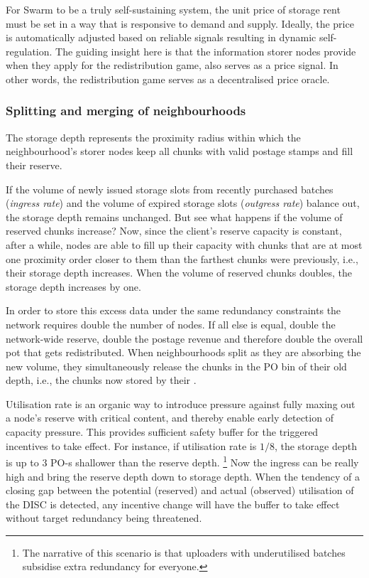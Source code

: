 For Swarm to be a truly self-sustaining system, the unit price of storage rent must be set in a way that is responsive to demand and supply. Ideally, the price is automatically adjusted based on reliable signals resulting in dynamic self-regulation. The guiding insight here is that the information storer nodes provide when  they apply for the redistribution game, also serves as a price signal. In other words, the redistribution game serves as a decentralised price oracle.



\subsubsection{Splitting and merging of neighbourhoods}

The storage depth represents the proximity radius within which the neighbourhood's storer nodes keep all chunks with valid postage stamps and fill their reserve. 


If the volume of newly issued storage slots from recently purchased batches (\emph{ingress rate}\/) and the volume of expired storage slots (\emph{outgress rate}\/) balance out, the storage depth remains unchanged.
But see what happens if the volume of  reserved chunks increase?
Now, since the client's reserve capacity is constant, after a while, nodes are able to fill up their capacity with chunks that are at most one proximity order closer to them than the farthest chunks were previously, i.e.,  their storage depth increases.
When the volume of reserved chunks doubles,  the storage depth increases by one.  

In order to store this excess data under the same redundancy constraints the network requires double the number of nodes. If all else is equal, double the network-wide reserve, double the postage revenue and therefore double the overall pot that gets redistributed. When neighbourhoods split as they are absorbing the new volume, they simultaneously release the chunks in the PO bin of their old depth, i.e., the chunks now stored by their . 

Utilisation rate is an organic way to  introduce pressure against fully maxing out a node's reserve with critical content, and thereby enable early detection of capacity pressure. This provides  sufficient safety buffer for the triggered incentives to take effect. For instance,  if utilisation rate is $1/8$, the storage depth is up to 3 PO-s shallower than the reserve depth.%
%
\footnote{The narrative of this scenario is that uploaders with underutilised batches subsidise extra redundancy for everyone.}
%
Now the ingress can be really high and bring the reserve depth down to storage depth. When the tendency of a closing gap between the potential (reserved) and actual (observed) utilisation of the DISC is detected, any incentive change will have the buffer to take effect without target redundancy being threatened. 

